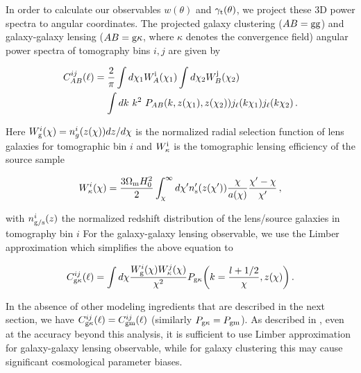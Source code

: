 \documentclass[fleqn,usenatbib]{mnras}
\newcommand{\gammat}{\ensuremath{\gamma_{\rm t}(\theta)}}
\newcommand{\wtheta}{\ensuremath{w(\theta)}}
\begin{document}
In order to calculate our observables $\wtheta$ and $\gammat$, we project these 3D power spectra to angular coordinates. %
The projected galaxy clustering ($AB = \rm{gg}$) and galaxy-galaxy lensing ($AB={\rm g\kappa}$, where $\kappa$ denotes the convergence field) angular power spectra of tomography bins $i,j$ are given by
\begin{linenomath*}
\begin{align}\label{eq:Cl_exact}
    C^{ij}_{AB}(\ell) &= \frac{2}{\pi} \int d\chi_1 W^{\rm i}_{A}(\chi_1) \int d\chi_2 W^{\rm j}_{B}(\chi_2) \nonumber \\
    &\mathrel{\phantom{=}} \int dk \ k^2 \ P_{ AB}(k,z(\chi_1),z(\chi_2)) j_{\ell}(k \chi_1) j_{\ell}(k \chi_2)\,.
\end{align}
\end{linenomath*}
Here $W^{i}_{\rm g}(\chi) = n^{i}_g (z(\chi))dz/d\chi$ is the normalized radial selection function of lens galaxies for tomographic bin $i$ and $W^{\rm i}_{\kappa}$ is the tomographic lensing efficiency of the source sample
\begin{linenomath*}
\begin{equation}
    W^{i}_{\rm \kappa} (\chi)= \frac{3\Omega_{\rm m} H_0^2}{2} \int_{\chi}^{\infty} d\chi' n'_{\rm s} (z(\chi'))\frac{\chi}{a(\chi)}\frac{\chi' - \chi}{\chi'}\,,
\end{equation}
\end{linenomath*}
with $n_{\rm{g/s}}^i(z)$ the normalized redshift distribution of the lens/source galaxies in tomography bin $i$
For the galaxy-galaxy lensing observable, we use the Limber approximation \citep{Limber:53, LoVerde:2008re} which simplifies the above equation to
\begin{linenomath*}
\begin{equation}\label{eq:Cl_limber}
    C^{ij}_{\rm g\kappa}(\ell)  = \int d\chi \frac{W^{i}_{\rm g}(\chi) W^{j}_{\rm \kappa}(\chi)}{\chi^2} P_{\rm g\kappa}\bigg(k=\frac{l + 1/2}{\chi},z(\chi)\bigg)\,.
\end{equation}
\end{linenomath*}
In the absence of other modeling ingredients that are described in the next section, we have $C^{ij}_{\rm g\kappa}(\ell) = C^{ij}_{\rm gm}(\ell)$ (similarly $P_{\rm g\kappa} = P_{\rm gm}$). As described in \citet{Fang_nonlimber}, even at the accuracy beyond this analysis, it is sufficient to use Limber approximation for galaxy-galaxy lensing observable, while for galaxy clustering this may cause significant cosmological parameter biases. 
\end{document}
